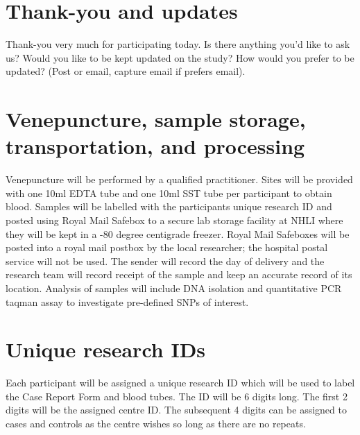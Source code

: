 \documentclass[a4paper,10pt]{article}
\begin{document}
\section{Thank-you and updates}
Thank-you very much for participating today. Is there anything you'd like to ask us? Would you like to be kept updated on the study? How would you prefer to be updated? 
(Post or email, capture email if prefers email).


\section{Venepuncture, sample storage, transportation, and processing} 

Venepuncture will be performed by a qualified practitioner. Sites will be provided with one 10ml EDTA tube and one 10ml SST tube per participant to obtain blood. Samples will be labelled with the participants unique research ID and posted using Royal Mail Safebox to a secure lab storage facility at NHLI where they will be kept in a -80 degree centigrade freezer. Royal Mail Safeboxes will be posted into a royal mail postbox by the local researcher; the hospital postal service will not
be used.
The sender will record the day of delivery and the research team will record receipt of the sample and keep an accurate record of its location. Analysis of samples will include DNA isolation and quantitative PCR taqman assay to investigate pre-defined SNPs of interest.

\section{Unique research IDs}

Each participant will be assigned a unique research ID which will be used to label the Case Report Form and blood tubes. The ID will be 6 digits long. The first 2 digits will be the assigned centre ID. The subsequent 4 digits can be assigned to cases and controls as the centre wishes so long as there are no repeats.
\end{document}
